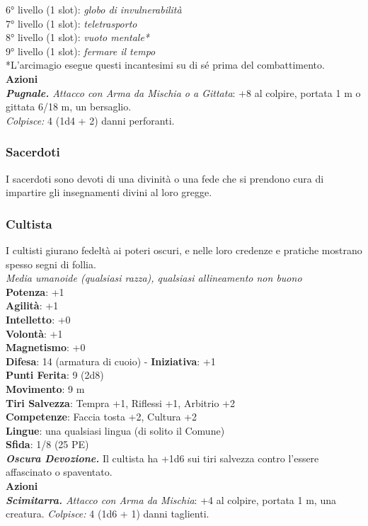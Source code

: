 \begin{multicols}{2}
6° livello (1 slot): \emph{globo di invulnerabilità}\\
7° livello (1 slot): \emph{teletrasporto}\\
8° livello (1 slot): \emph{vuoto mentale*}\\
9° livello (1 slot): \emph{fermare il tempo}\\
*L'arcimagio esegue questi incantesimi su di sé prima del  combattimento.\\
\smallskip\textbf{Azioni}\\
\emph{\textbf{Pugnale.} Attacco con Arma da Mischia o a Gittata}: +8 al colpire, portata 1 m o gittata 6/18 m, un bersaglio.\\
\emph{Colpisce:} 4 (1d4 + 2) danni perforanti.\\

\subsubsection{Sacerdoti}
I sacerdoti sono devoti di una divinità o una fede che si prendono cura di impartire gli insegnamenti divini al loro gregge.\\

\subsubsection{Cultista}
I cultisti giurano fedeltà ai poteri oscuri, e nelle loro credenze e pratiche mostrano spesso segni di follia.\\
\emph{Media umanoide (qualsiasi razza), qualsiasi allineamento non buono}\\
\textbf{Potenza}: +1\\
\textbf{Agilità}: +1\\
\textbf{Intelletto}: +0\\
\textbf{Volontà}: +1\\
\textbf{Magnetismo}: +0\\
\textbf{Difesa}: 14 (armatura di cuoio) - \textbf{Iniziativa}: +1\\
\textbf{Punti Ferita}: 9 (2d8)\\
\textbf{Movimento}: 9 m\\
\textbf{Tiri Salvezza}: Tempra +1, Riflessi +1, Arbitrio +2 \\
\textbf{Competenze}: Faccia tosta +2, Cultura +2\\
\textbf{Lingue}: una qualsiasi lingua (di solito il Comune)\\
\textbf{Sfida}: 1/8 (25 PE)\smallskip\\
\emph{\textbf{Oscura Devozione.}} Il cultista ha +1d6 sui tiri salvezza contro l'essere affascinato o spaventato.\\
\smallskip\textbf{Azioni}\\
\emph{\textbf{Scimitarra.} Attacco con Arma da Mischia}: +4 al colpire, portata 1 m, una creatura.
\emph{Colpisce:} 4 (1d6 + 1) danni taglienti.\\


\end{multicols}

